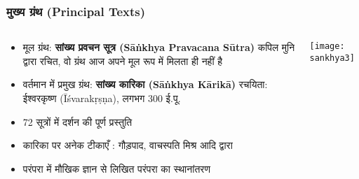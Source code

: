 \begin{frame}[fragile]\frametitle{मुख्य ग्रंथ (Principal Texts)}
\begin{columns}
    \begin{column}[T]{0.6\linewidth}
      \begin{itemize}
        \item मूल ग्रंथ: \textbf{सांख्य प्रवचन सूत्र (Sāṅkhya Pravacana Sūtra)} कपिल मुनि द्वारा रचित, वो ग्रंथ आज अपने मूल रूप में मिलता ही नहीं है
        \item वर्तमान में प्रमुख ग्रंथ: \textbf{सांख्य कारिका (Sāṅkhya Kārikā)} रचयिता: ईश्वरकृष्ण (Īśvarakṛṣṇa), लगभग 300 ई.पू.
        \item 72 सूत्रों में दर्शन की पूर्ण प्रस्तुति
        \item कारिका पर अनेक टीकाएँ : गौड़पाद, वाचस्पति मिश्र आदि द्वारा
        \item परंपरा में मौखिक ज्ञान से लिखित परंपरा का स्थानांतरण
      \end{itemize}
    \end{column}
    \begin{column}[T]{0.4\linewidth}
      \begin{center}
        \texttt{[image: sankhya3]}
      \end{center}	
    \end{column}
\end{columns}
\end{frame}

